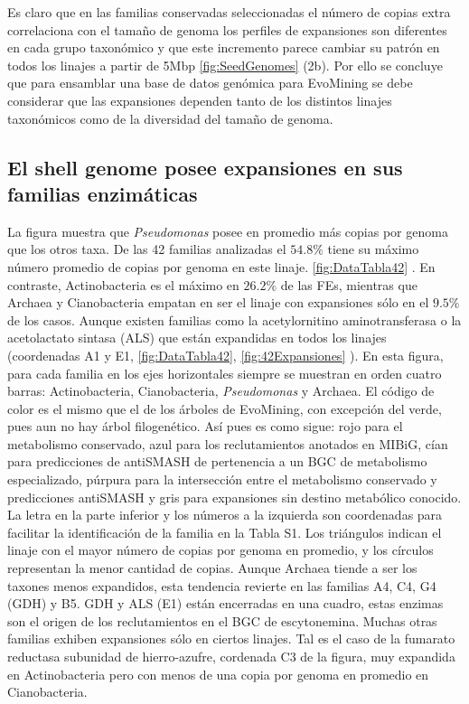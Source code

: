 \documentclass[12pt,twoside]{reedthesis}
\begin{document}
  Es claro que en las familias conservadas seleccionadas el número de
  copias extra correlaciona con el tamaño de genoma los perfiles de
  expansiones son diferentes en cada grupo taxonómico y que este
  incremento parece cambiar su patrón en todos los linajes a partir de
  5Mbp \autoref{fig:SeedGenomes} (2b). Por ello se concluye que para
  ensamblar una base de datos genómica para EvoMining se debe considerar
  que las expansiones dependen tanto de los distintos linajes taxonómicos
  como de la diversidad del tamaño de genoma.
  
  \subsection{El shell genome posee expansiones en sus familias
  enzimáticas}\label{el-shell-genome-posee-expansiones-en-sus-familias-enzimaticas}
  
  La figura muestra que \emph{Pseudomonas} posee en promedio más copias
  por genoma que los otros taxa. De las 42 familias analizadas el
  \(54.8\%\) tiene su máximo número promedio de copias por genoma en este
  linaje. \autoref{fig:DataTabla42} . En contraste, Actinobacteria es el
  máximo en \(26.2\%\) de las FEs, mientras que Archaea y Cianobacteria
  empatan en ser el linaje con expansiones sólo en el \(9.5\%\) de los
  casos. Aunque existen familias como la acetylornitino aminotransferasa o
  la acetolactato sintasa (ALS) que están expandidas en todos los linajes
  (coordenadas A1 y E1, \autoref{fig:DataTabla42},
  \autoref{fig:42Expansiones} ). En esta figura, para cada familia en los
  ejes horizontales siempre se muestran en orden cuatro barras:
  Actinobacteria, Cianobacteria, \emph{Pseudomonas} y Archaea. El código
  de color es el mismo que el de los árboles de EvoMining, con excepción
  del verde, pues aun no hay árbol filogenético. Así pues es como sigue:
  rojo para el metabolismo conservado, azul para los reclutamientos
  anotados en MIBiG, cían para predicciones de antiSMASH de pertenencia a
  un BGC de metabolismo especializado, púrpura para la intersección entre
  el metabolismo conservado y predicciones antiSMASH y gris para
  expansiones sin destino metabólico conocido. La letra en la parte
  inferior y los números a la izquierda son coordenadas para facilitar la
  identificación de la familia en la Tabla S1. Los triángulos indican el
  linaje con el mayor número de copias por genoma en promedio, y los
  círculos representan la menor cantidad de copias. Aunque Archaea tiende
  a ser los taxones menos expandidos, esta tendencia revierte en las
  familias A4, C4, G4 (GDH) y B5. GDH y ALS (E1) están encerradas en una
  cuadro, estas enzimas son el origen de los reclutamientos en el BGC de
  escytonemina. Muchas otras familias exhiben expansiones sólo en ciertos
  linajes. Tal es el caso de la fumarato reductasa subunidad de
  hierro-azufre, cordenada C3 de la figura, muy expandida en
  Actinobacteria pero con menos de una copia por genoma en promedio en
  Cianobacteria.
  
\end{document}
